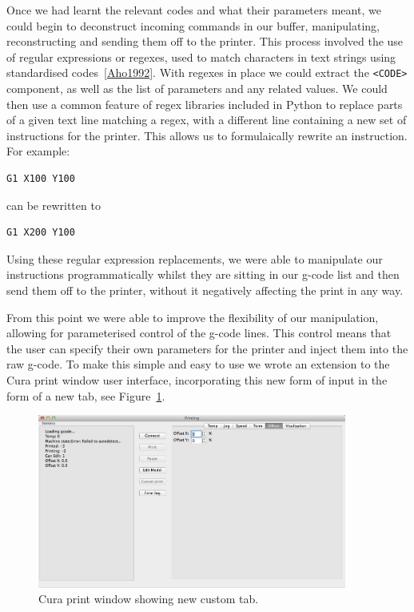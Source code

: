 \documentclass[11pt]{report} %
\begin{document}
Once we had learnt the relevant codes and what their parameters meant, we could begin to deconstruct incoming commands in our buffer, manipulating, reconstructing and sending them off to the printer. This process involved the use of regular expressions or regexes, used to match characters in text strings using standardised codes~\ref{Aho1992}. With regexes in place we could extract the \verb|<CODE>| component, as well as the list of parameters and any related values. We could then use a common feature of regex libraries included in Python to replace parts of a given text line matching a regex, with a different line containing a new set of instructions for the printer. This allows us to formulaically rewrite an instruction. For example:
\begin{verbatim}
G1 X100 Y100
\end{verbatim}
can be rewritten to
\begin{verbatim}
G1 X200 Y100
\end{verbatim}

Using these regular expression replacements, we were able to manipulate our instructions programmatically whilst they are sitting in our g-code list and then send them off to the printer, without it negatively affecting the print in any way.

	From this point we were able to improve the flexibility of our manipulation, allowing for parameterised control of the g-code lines. This control means that the user can specify their own parameters for the printer and inject them into the raw g-code. 
To make this simple and easy to use we wrote an extension to the Cura print window user interface, incorporating this new form of input in the form of a new tab, see Figure~\ref{figure:CuraCustomTab}.

\begin{figure}[H]
  \centering
  \includegraphics[width=4in]{CuraCustomTab.png}
  \caption{Cura print window showing new custom tab.}
  \label{figure:CuraCustomTab}
\end{figure}
\end{document}
